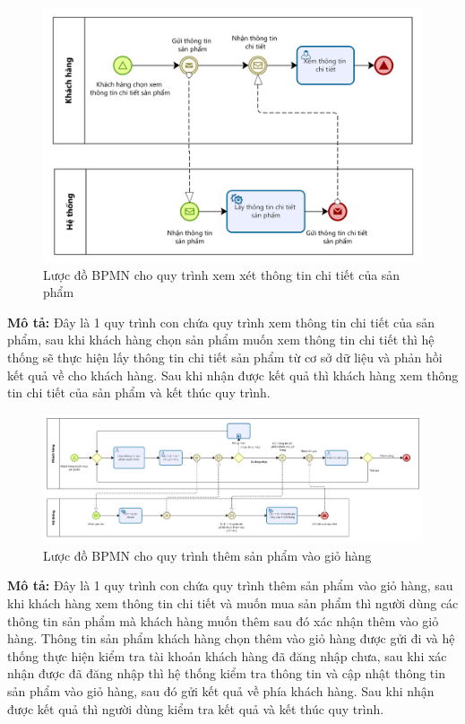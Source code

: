     \begin{figure}[!htp]
        \centering
        \includegraphics[width=12cm]{img/BPMN/customer_buy/customer_product_detail.png}
        \newline
        \caption{Lược đồ BPMN cho quy trình xem xét thông tin chi tiết của sản phẩm}
    \end{figure}
    \textbf{Mô tả:} Đây là 1 quy trình con chứa quy trình xem thông tin chi tiết của sản phẩm, sau khi khách hàng chọn sản phẩm muốn xem thông tin chi tiết thì hệ thống sẽ thực hiện lấy thông tin chi tiết sản phẩm từ cơ sở dữ liệu và phản hồi kết quả về cho khách hàng. Sau khi nhận được kết quả thì khách hàng xem thông tin chi tiết của sản phẩm và kết thúc quy trình.

    \begin{figure}[!htp]
        \centering
        \includegraphics[width=15cm]{img/BPMN/customer_buy/customer_add_to_card.png}
        \newline
        \caption{Lược đồ BPMN cho quy trình thêm sản phẩm vào giỏ hàng}
    \end{figure} 
    \textbf{Mô tả:} Đây là 1 quy trình con chứa quy trình thêm sản phẩm vào giỏ hàng, sau khi khách hàng xem thông tin chi tiết và muốn mua sản phẩm thì người dùng các thông tin sản phẩm mà khách hàng muốn thêm sau đó xác nhận thêm vào giỏ hàng. Thông tin sản phẩm khách hàng chọn thêm vào giỏ hàng được gửi đi và hệ thống thực hiện kiểm tra tài khoản khách hàng đã đăng nhập chưa, sau khi xác nhận được đã đăng nhập thì hệ thống kiểm tra thông tin và cập nhật thông tin sản phẩm vào giỏ hàng, sau đó gửi kết quả về phía khách hàng. Sau khi nhận được kết quả thì người dùng kiểm tra kết quả và kết thúc quy trình.
     
